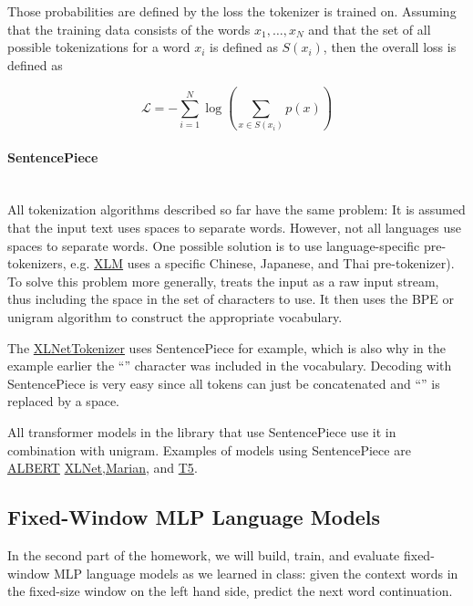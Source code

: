 Those probabilities are defined by the loss the tokenizer is trained on. Assuming that the training data consists of the words $x_{1}, \dots, x_{N}$ and that the set of all possible tokenizations for a word $x_{i}$ is defined as $S(x_{i})$, then the overall loss is defined as

$$\mathcal{L} = -\sum_{i=1}^{N} \log \left ( \sum_{x \in S(x_{i})} p(x) \right )$$

\paragraph{SentencePiece}\mbox{}\\ \label{paragraph:sentetncepiece}
All tokenization algorithms described so far have the same problem: It is assumed that the input text uses spaces to separate words. However, not all languages use spaces to separate words. One possible solution is to use language-specific pre-tokenizers, e.g. \href{https://huggingface.co/docs/transformers/main/en/model_doc/xlm}{XLM} uses a specific Chinese, Japanese, and Thai pre-tokenizer). To solve this problem more generally, \cite{kudorichardson2018sentencepiece} treats the input as a raw input stream, thus including the space in the set of characters to use. It then uses the BPE or unigram algorithm to construct the appropriate vocabulary.

The \href{https://huggingface.co/docs/transformers/main/en/model_doc/xlnet#transformers.XLNetTokenizer}{XLNetTokenizer} uses SentencePiece for example, which is also why in the example earlier the
``\textunderscore'' character was included in the vocabulary. Decoding with SentencePiece is very easy since all tokens can just be concatenated and ``\textunderscore'' is replaced by a space.

All transformer models in the library that use SentencePiece use it in combination with unigram. Examples of models using SentencePiece are \href{https://huggingface.co/docs/transformers/main/en/model_doc/albert}{ALBERT} \href{https://huggingface.co/docs/transformers/main/en/model_doc/xlnet}{XLNet},\href{https://huggingface.co/docs/transformers/main/en/model_doc/marian}{Marian}, and \href{https://huggingface.co/docs/transformers/main/en/model_doc/t5}{T5}.

\subsection{Fixed-Window MLP Language Models}
In the second part of the homework, we will build, train, and evaluate fixed-window MLP language models as we learned in class: given the context words in the fixed-size window on the left hand side, predict the next word continuation.

